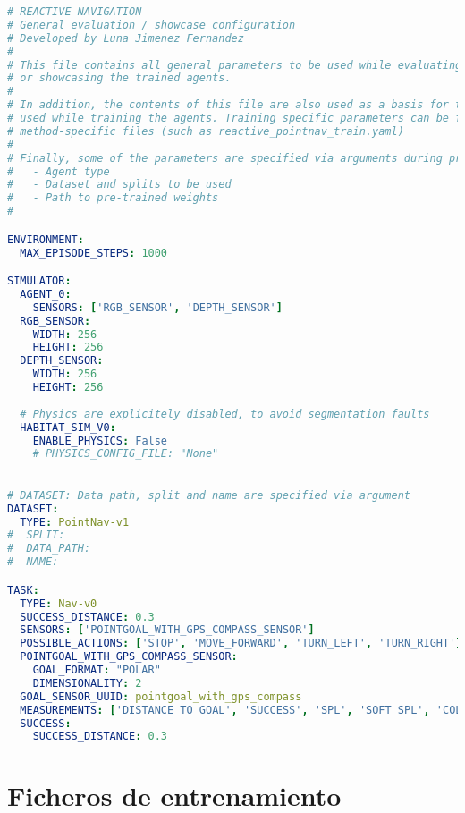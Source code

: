 \begin{lstlisting}[language=yaml]
# REACTIVE NAVIGATION
# General evaluation / showcase configuration
# Developed by Luna Jimenez Fernandez
#
# This file contains all general parameters to be used while evaluating 
# or showcasing the trained agents.
# 
# In addition, the contents of this file are also used as a basis for the configuration
# used while training the agents. Training specific parameters can be found in the 
# method-specific files (such as reactive_pointnav_train.yaml)
#
# Finally, some of the parameters are specified via arguments during program launch:
#	- Agent type
#	- Dataset and splits to be used
#	- Path to pre-trained weights
#

ENVIRONMENT:
  MAX_EPISODE_STEPS: 1000

SIMULATOR:
  AGENT_0:
    SENSORS: ['RGB_SENSOR', 'DEPTH_SENSOR']
  RGB_SENSOR:
    WIDTH: 256
    HEIGHT: 256
  DEPTH_SENSOR:
    WIDTH: 256
    HEIGHT: 256
    
  # Physics are explicitely disabled, to avoid segmentation faults
  HABITAT_SIM_V0:
    ENABLE_PHYSICS: False
    # PHYSICS_CONFIG_FILE: "None"
    

# DATASET: Data path, split and name are specified via argument
DATASET:
  TYPE: PointNav-v1
#  SPLIT: 
#  DATA_PATH:
#  NAME:

TASK:
  TYPE: Nav-v0
  SUCCESS_DISTANCE: 0.3
  SENSORS: ['POINTGOAL_WITH_GPS_COMPASS_SENSOR']
  POSSIBLE_ACTIONS: ['STOP', 'MOVE_FORWARD', 'TURN_LEFT', 'TURN_RIGHT']
  POINTGOAL_WITH_GPS_COMPASS_SENSOR:
    GOAL_FORMAT: "POLAR"
    DIMENSIONALITY: 2
  GOAL_SENSOR_UUID: pointgoal_with_gps_compass
  MEASUREMENTS: ['DISTANCE_TO_GOAL', 'SUCCESS', 'SPL', 'SOFT_SPL', 'COLLISIONS']
  SUCCESS:
    SUCCESS_DISTANCE: 0.3
\end{lstlisting}

\section{Ficheros de entrenamiento}

